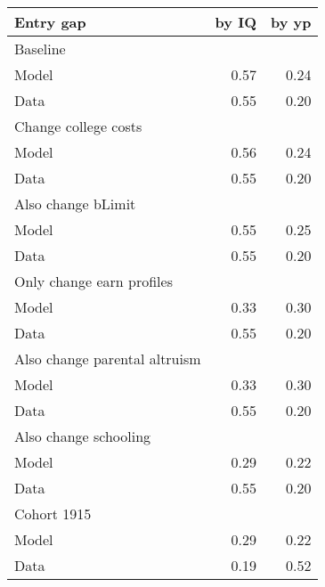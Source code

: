 \begin{tabular}{lrr}
\hline
Entry gap & by IQ  & by yp  \\
\hline
Baseline &   &   \\
Model & 0.57  & 0.24  \\
Data & 0.55  & 0.20  \\
Change college costs &   &   \\
Model & 0.56  & 0.24  \\
Data & 0.55  & 0.20  \\
Also change bLimit &   &   \\
Model & 0.55  & 0.25  \\
Data & 0.55  & 0.20  \\
Only change earn profiles &   &   \\
Model & 0.33  & 0.30  \\
Data & 0.55  & 0.20  \\
Also change parental altruism &   &   \\
Model & 0.33  & 0.30  \\
Data & 0.55  & 0.20  \\
Also change schooling &   &   \\
Model & 0.29  & 0.22  \\
Data & 0.55  & 0.20  \\
Cohort 1915 &   &   \\
Model & 0.29  & 0.22  \\
Data & 0.19  & 0.52  \\
\hline
\end{tabular}%
